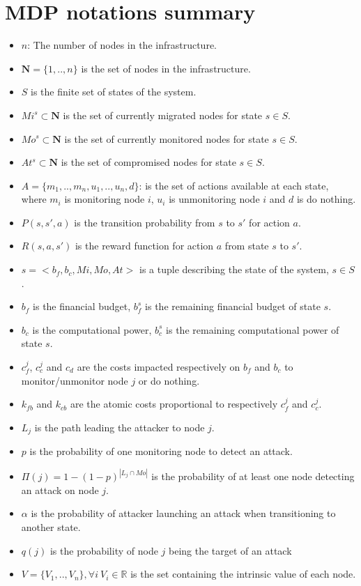 \section{MDP notations summary}
\begin{itemize}
    \item $n$: The number of nodes in the infrastructure.
    \item $\textbf{N} = \{1,..,n\}$ is the set of nodes in the infrastructure.
    \item $S$ is the finite set of states of the system. 
    \item $Mi^s \subset \textbf{N} $ is the set of currently migrated nodes for state $s\in S$.
    \item $Mo^s \subset \textbf{N}$ is the set of currently monitored nodes for state $s\in S$.
    \item $At^s \subset \textbf{N}$ is the set of compromised nodes for state $s \in S$.
    \item $A = \{m_1,..,m_n,u_1,..,u_n,d\}$: is the set of actions available at each state, where $m_i$ is monitoring node $i$, $u_i$ is unmonitoring node $i$ and $d$ is do nothing.
    \item $P(s,s',a)$ is the transition probability from $s$ to $s'$ for action $a$.
    \item $R(s,a,s')$ is the reward function for action $a$ from state $s$ to $s'$.
    \item $s=<b_f,b_c,Mi,Mo,At>$ is a tuple describing the state of the system, $s\in S$.
    \item $b_f$ is the financial budget, $b_f^s$ is the remaining financial budget of state $s$.
    \item $b_c$ is the computational power, $b_c^s$ is the remaining computational power of state $s$.
    \item $c_f^j$, $c_c^j$ and $c_d$ are the costs impacted respectively on $b_f$ and $b_c$ to monitor/unmonitor node $j$ or do nothing.
    \item $k_{fb}$ and $k_{cb}$ are the atomic costs proportional to respectively $c_f^j$ and $c_c^j$.
    \item $L_j$ is the path leading the attacker to node $j$.
    \item $p$ is the probability of one monitoring node to detect an attack.
    \item  $\Pi(j)=1 - (1-p)^{|L_j\cap Mo|}$ is the probability of at least one node detecting an attack on node $j$.
    \item $\alpha$ is the probability of attacker launching an attack when transitioning to another state.
    \item $q(j)$ is the probability of node $j$ being the target of an attack
    \item $V = \{V_1,..,V_n\}, \forall i~V_i \in \mathbb{R}$ is the set containing the intrinsic value of each node.
\end{itemize}